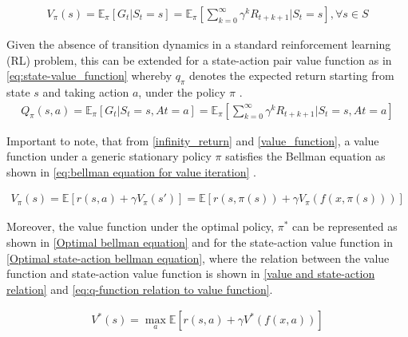 \begin{equation}
	\begin{aligned}
		V_{\pi}(s) =  \mathbb{E}_{\pi}\left[{G_t | S_t = s}\right] =  \mathbb{E}_{\pi} 
		\left [\sum_{k=0}^{\infty} \gamma^k R_{t+k+1} | S_t = s \right], \forall s \in S 
	\end{aligned}
	\label{value_function}
\end{equation}

Given the absence of transition dynamics in a standard reinforcement learning (RL) problem, this can be extended for a state-action pair value function as in \autoref{eq:state-value_function} whereby $q_{\pi}$ denotes the expected return starting from state $s$ and taking action $a$, under the policy $\pi$ \cite{ajagekarDeepReinforcementLearning2022}.
\begin{equation}
	\begin{aligned}
		Q_{\pi}(s,a) =  \mathbb{E}_{\pi}\left[{G_t | S_t = s, At = a}\right] =  \mathbb{E}_{\pi}\left[\sum_{k=0}^{\infty} \gamma^k R_{t+k+1} | S_t = s, At = a\right]
	\end{aligned}
	\label{eq:state-value_function}
\end{equation}

Important to note, that from \autoref{infinity_return} and \autoref{value_function}, a value function under a generic stationary policy $\pi$ satisfies the Bellman equation as shown in \autoref{eq:bellman equation for value iteration} \cite{bertsekasNewtonMethodReinforcement2022,bellmanDynamicProgramming1966}.


\begin{equation}
	\begin{aligned}
		V_{\pi}(s) = \mathbb{E} \left[r(s,a) + \gamma V_{\pi}(s') \right] = \mathbb{E} \left[r(s,\pi(s)) + \gamma V_{\pi}(f(x,\pi(s))) \right]
	\end{aligned}
	\label{eq:bellman equation for value iteration}
\end{equation}

Moreover, the value function under the optimal policy, $\pi^*$ can be represented as shown in \autoref{Optimal bellman equation} and for the state-action value function in \autoref{Optimal state-action bellman equation}, where the relation between the value function and state-action value function is shown in \autoref{value and state-action relation} and \autoref{eq:q-function relation to value function}.

\begin{equation}
	\begin{aligned}
		V^*(s) =\max_{a} \mathbb{E} \left[r(s,a) + \gamma V^*(f(x,a)) \right]
	\end{aligned}
	\label{Optimal bellman equation}
\end{equation}

